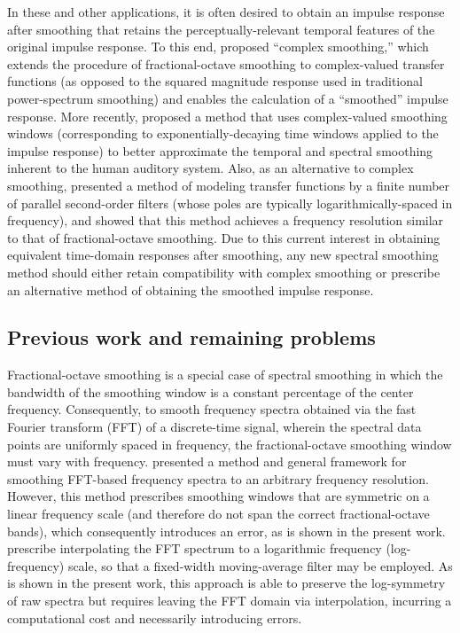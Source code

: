 In these and other applications, it is often desired to obtain an impulse response after smoothing that retains the perceptually-relevant temporal features of the original impulse response.
To this end, \citet{HatziantoniouMourjopoulos2000} proposed ``complex smoothing,'' which extends the procedure of fractional-octave smoothing to complex-valued transfer functions (as opposed to the squared magnitude response used in traditional power-spectrum smoothing) and enables the calculation of a ``smoothed'' impulse response.
More recently, \citet{Volk2011} proposed a method that uses complex-valued smoothing windows (corresponding to exponentially-decaying time windows applied to the impulse response) to better approximate the temporal and spectral smoothing inherent to the human auditory system.
Also, as an alternative to complex smoothing, \citet{Bank2013} presented a method of modeling transfer functions by a finite number of parallel second-order filters (whose poles are typically logarithmically-spaced in frequency), and showed that this method achieves a frequency resolution similar to that of fractional-octave smoothing.
Due to this current interest in obtaining equivalent time-domain responses after smoothing, any new spectral smoothing method should either retain compatibility with complex smoothing or prescribe an alternative method of obtaining the smoothed impulse response.

\subsection{Previous work and remaining problems}
Fractional-octave smoothing is a special case of spectral smoothing in which the bandwidth of the smoothing window is a constant percentage of the center frequency.
Consequently, to smooth frequency spectra obtained via the fast Fourier transform (FFT) of a discrete-time signal, wherein the spectral data points are uniformly spaced in frequency, the fractional-octave smoothing window must vary with frequency.
\citet{HatziantoniouMourjopoulos2000} presented a method and general framework for smoothing FFT-based frequency spectra to an arbitrary frequency resolution.
However, this method prescribes smoothing windows that are symmetric on a linear frequency scale (and therefore do not span the correct fractional-octave bands), which consequently introduces an error, as is shown in the present work.
\citet{Lipshitz1985} prescribe interpolating the FFT spectrum to a logarithmic frequency (log-frequency) scale, so that a fixed-width moving-average filter may be employed.
As is shown in the present work, this approach is able to preserve the log-symmetry of raw spectra but requires leaving the FFT domain via interpolation, incurring a computational cost and necessarily introducing errors.

